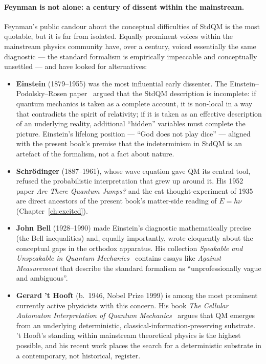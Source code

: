 \paragraph{Feynman is not alone: a century of dissent within the mainstream.}
Feynman's public candour about the conceptual difficulties of StdQM is the most quotable, but it is far from isolated. Equally prominent voices within the mainstream physics community have, over a century, voiced essentially the same diagnostic --- the standard formalism is empirically impeccable and conceptually unsettled --- and have looked for alternatives:
\begin{itemize}
\item \textbf{Einstein} (1879--1955) was the most influential early dissenter. The Einstein--Podolsky--Rosen paper~\cite{EPR1935} argued that the StdQM description is incomplete: if quantum mechanics is taken as a complete account, it is non-local in a way that contradicts the spirit of relativity; if it is taken as an effective description of an underlying reality, additional ``hidden'' variables must complete the picture. Einstein's lifelong position --- ``God does not play dice'' --- aligned with the present book's premise that the indeterminism in StdQM is an artefact of the formalism, not a fact about nature.
\item \textbf{Schr\"odinger} (1887--1961), whose wave equation gave QM its central tool, refused the probabilistic interpretation that grew up around it. His 1952 paper \emph{Are There Quantum Jumps?} and the cat thought-experiment of 1935 are direct ancestors of the present book's matter-side reading of $E = h\nu$ (Chapter~\ref{ch:excited}).
\item \textbf{John Bell} (1928--1990) made Einstein's diagnostic mathematically precise (the Bell inequalities) and, equally importantly, wrote eloquently about the conceptual gaps in the orthodox apparatus. His collection \emph{Speakable and Unspeakable in Quantum Mechanics}~\cite{BellSpeakable} contains essays like \emph{Against Measurement} that describe the standard formalism as ``unprofessionally vague and ambiguous''.
\item \textbf{Gerard 't Hooft} (b.~1946, Nobel Prize 1999) is among the most prominent currently active physicists with this concern. His book \emph{The Cellular Automaton Interpretation of Quantum Mechanics}~\cite{tHooft2016} argues that QM emerges from an underlying deterministic, classical-information-preserving substrate. 't Hooft's standing within mainstream theoretical physics is the highest possible, and his recent work places the search for a deterministic substrate in a contemporary, not historical, register.

\end{itemize}
